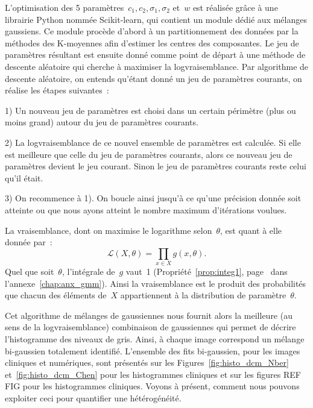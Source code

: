 \documentclass[main.tex]{subfiles}
\begin{document}
L'optimisation des 5 paramètres~$c_1,c_2,\sigma_1,\sigma_2$ et~$w$ est réalisée grâce à une librairie Python nommée Scikit-learn, qui contient un module dédié aux mélanges gaussiens. Ce module procède d'abord à un partitionnement %
des données par la méthodes des K-moyennes afin d'estimer les centres des composantes. Le jeu de paramètres résultant est ensuite donné comme point de départ à une méthode de descente aléatoire qui cherche à maximiser la logvraisemblance. Par algorithme de descente aléatoire, on entends qu'étant donné un jeu de paramètres courants, on réalise les étapes suivantes~:
\begin{myitemize}
\item[1)] Un nouveau jeu de paramètres est choisi dans un certain périmètre (plus ou moins grand) autour du jeu de paramètres courants.
\item[2)] La logvraisemblance de ce nouvel ensemble de paramètres est calculée. Si elle est meilleure que celle du jeu de paramètres courants, alors ce nouveau jeu de paramètres devient le jeu courant. Sinon le jeu de paramètres courants reste celui qu'il était.
\item[3)] On recommence à 1). On boucle ainsi jusqu'à ce qu'une précision donnée soit atteinte ou que nous ayons atteint le nombre maximum d'itérations voulues.
\end{myitemize}
La vraisemblance, dont on maximise le logarithme selon~$\theta$, est quant à elle donnée par~:
\begin{equation}
\mathcal{L}(X,\theta) = \prod_{x \in X} g(x,\theta).
\end{equation}
Quel que soit~$\theta$, l'intégrale de~$g$ vaut~1 (\cf Propriété~\ref{prop:integ1}, page~\pageref{prop:integ1} dans l'annexe~\ref{chap:anx_gmm}). 
Ainsi la vraisemblance est le produit des probabilités que chacun des éléments de~$X$ appartiennent à la distribution de paramètre~$\theta$.


Cet algorithme de mélanges de gaussiennes nous fournit alors la meilleure  (au sens de la logvraisemblance) combinaison de gaussiennes qui permet de décrire l'histogramme des niveaux de gris. Ainsi, à chaque image correspond un mélange bi-gaussien totalement identifié. 
L'ensemble des fits bi-gaussien, pour les images cliniques et numériques, sont présentés sur les Figures~\ref{fig:histo_dcm_Nber} et~\ref{fig:histo_dcm_Chen} pour les histogrammes cliniques et sur les figures REF FIG pour les histogrammes cliniques. Voyons à présent, comment nous pouvons exploiter ceci pour quantifier une hétérogénéité. 
\end{document}
